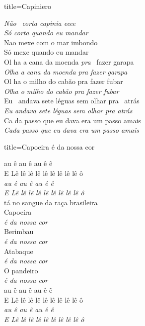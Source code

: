 \documentclass[fontsize=14pt, paper=a4, twoside, DIV=20]{scrreprt} %
\begin{document}
\begin{multicols*}{2}
\begin{song}{title={Capiniero}}
\begin{verse*}
            \textit{Não} \  \textit{corta capinia eee}\textit{e} \\
            \textit{Só corta quando eu mand}\textit{ar} \\
            Nao mexe com o mar imbondo \\
            Só mexe quando eu mandar\\
            Ol ha a cana da moenda \textit{pra} \ fazer garapa\\
            \textit{Olha a cana da moenda pra fazer garapa}\\
            Ol ha o milho do cabão pra fazer fubar\\
            \textit{Olha o milho do cabão pra fazer fubar}\\
            Eu \ andava sete léguas sem olhar pra \ atrás\\
            \textit{Eu andava sete léguas sem olhar pra atrás}\\
            Ca da passo que eu dava era um passo amais\\
            \textit{Cada passo que eu dava era um passo amais}\\
        \end{verse*}
\end{song}

\begin{song}{title={Capoeira é da nossa cor}}
        \begin{verse*}
            au ê au ê au ê ê\\
            E Lê lê lê lê lê lê lê lê lê ô\\
            \textit{au ê au ê au ê ê}\\
            \textit{E Lê lê lê lê lê lê lê lê lê ô}\\
            tá no sangue da raça brasileira\\
            Capoeira\\
            \textit{é da nossa cor}\\
            Berimbau\\
            \textit{é da nossa cor}\\
            Atabaque\\
            \textit{é da nossa cor}\\
            O pandeiro\\
            \textit{é da nossa cor}\\
            au ê au ê au ê ê\\
            E Lê lê lê lê lê lê lê lê lê ô\\
            \textit{au ê au ê au ê ê}\\
            \textit{E Lê lê lê lê lê lê lê lê lê ô}\\
        \end{verse*}
\end{song}


\end{multicols*}
\end{document}

